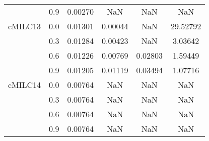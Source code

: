 \begin{longtable}{cccccc}
        & 0.9 & 0.00270 & NaN & NaN & NaN \\
cMILC13 & 0.0 & 0.01301 & 0.00044 & NaN & 29.52792 \\
        & 0.3 & 0.01284 & 0.00423 & NaN & 3.03642 \\
        & 0.6 & 0.01226 & 0.00769 & 0.02803 & 1.59449 \\
        & 0.9 & 0.01205 & 0.01119 & 0.03494 & 1.07716 \\
cMILC14 & 0.0 & 0.00764 & NaN & NaN & NaN \\
        & 0.3 & 0.00764 & NaN & NaN & NaN \\
        & 0.6 & 0.00764 & NaN & NaN & NaN \\
        & 0.9 & 0.00764 & NaN & NaN & NaN \\
\end{longtable}
